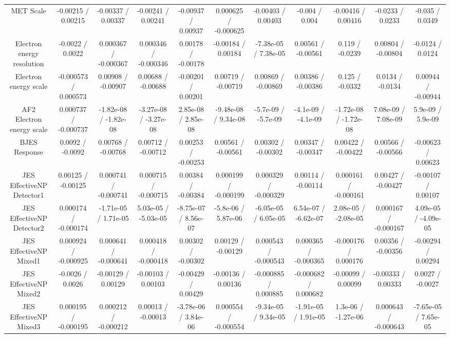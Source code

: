 \begin{table}[htbp]
\begin{center}
\begin{tabular}{|c|c|c|c|c|c|c|c|c|c|c|}
  MET Scale & -0.00215 / 0.00215 & -0.00337 / 0.00337 & -0.00241 / 0.00241 & -0.00937 / 0.00937 & 0.000625 / -0.000625 & -0.00403 / 0.00403 & -0.004 / 0.004 & -0.00416 / 0.00416 & -0.0233 / 0.0233 & -0.035 / 0.0349 \\ 
  Electron energy resolution & -0.0022 / 0.0022 & 0.000367 / -0.000367 & 0.000346 / -0.000346 & 0.00178 / -0.00178 & -0.00184 / 0.00184 & -7.38e-05 / 7.38e-05 & 0.00561 / -0.00561 & 0.119 / -0.0239 & 0.00804 / -0.00804 & -0.0124 / 0.0124 \\ 
  Electron energy scale & -0.000573 / 0.000573 & 0.00908 / -0.00907 & 0.00688 / -0.00688 & -0.00201 / 0.00201 & 0.00719 / -0.00719 & 0.00869 / -0.00869 & 0.00386 / -0.00386 & 0.125 / -0.0332 & 0.0134 / -0.0134 & 0.00944 / -0.00944 \\ 
  AF2 Electron energy scale & 0.000737 / -0.000737 & -1.82e-08 / -1.82e-08 & -3.27e-08 / -3.27e-08 & 2.85e-08 / 2.85e-08 & -9.48e-08 / 9.34e-08 & -5.7e-09 / -5.7e-09 & -4.1e-09 / -4.1e-09 & -1.72e-08 / -1.72e-08 & 7.08e-09 / 7.08e-09 & 5.9e-09 / 5.9e-09 \\ 
  BJES Response & 0.0092 / -0.0092 & 0.00768 / -0.00768 & 0.00712 / -0.00712 & 0.00253 / -0.00253 & 0.00561 / -0.00561 & 0.00302 / -0.00302 & 0.00347 / -0.00347 & 0.00422 / -0.00422 & 0.00566 / -0.00566 & -0.00623 / 0.00623 \\ 
  JES EffectiveNP Detector1 & 0.00125 / -0.00125 & 0.000741 / -0.000741 & 0.000715 / -0.000715 & 0.00384 / -0.00384 & 0.000199 / -0.000199 & 0.000329 / -0.000329 & 0.00114 / -0.00114 & 0.000161 / -0.000161 & 0.00427 / -0.00427 & -0.00107 / 0.00107 \\ 
  JES EffectiveNP Detector2 & 0.000174 / -0.000174 & -1.71e-05 / 1.71e-05 & 5.03e-05 / -5.03e-05 & -8.75e-07 / 8.56e-07 & -5.8e-06 / 5.87e-06 & -6.05e-05 / 6.05e-05 & 6.54e-07 / -6.62e-07 & 2.08e-05 / -2.08e-05 & 0.000167 / -0.000167 & 4.09e-05 / -4.09e-05 \\ 
  JES EffectiveNP Mixed1 & 0.000924 / -0.000925 & 0.000641 / -0.000641 & 0.000418 / -0.000418 & 0.00302 / -0.00302 & 0.00129 / -0.00129 & 0.000543 / -0.000543 & 0.000365 / -0.000365 & -0.000176 / 0.000176 & 0.00356 / -0.00356 & -0.00294 / 0.00294 \\ 
  JES EffectiveNP Mixed2 & -0.0026 / 0.0026 & -0.00129 / 0.00129 & -0.00103 / 0.00103 & -0.00429 / 0.00429 & -0.00136 / 0.00136 & -0.000885 / 0.000885 & -0.000682 / 0.000682 & -0.00099 / 0.00099 & -0.00333 / 0.00333 & 0.0027 / -0.0027 \\ 
  JES EffectiveNP Mixed3 & 0.000195 / -0.000195 & 0.000212 / -0.000212 & 0.00013 / -0.00013 & -3.78e-06 / 3.84e-06 & 0.000554 / -0.000554 & -9.34e-05 / 9.34e-05 & -1.91e-05 / 1.91e-05 & 1.3e-06 / -1.27e-06 & 0.000643 / -0.000643 & -7.65e-05 / 7.65e-05 \\ 

\end{tabular}
\end{center}
\end{table}
